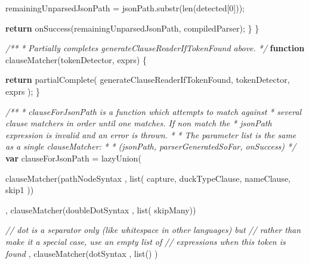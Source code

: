\documentclass[]{article}
\newenvironment{Shaded}{}{}
\newcommand{\KeywordTok}[1]{\textcolor[rgb]{0.00,0.44,0.13}{\textbf{{#1}}}}
\newcommand{\DecValTok}[1]{\textcolor[rgb]{0.25,0.63,0.44}{{#1}}}
\newcommand{\CommentTok}[1]{\textcolor[rgb]{0.38,0.63,0.69}{\textit{{#1}}}}
\newcommand{\OtherTok}[1]{\textcolor[rgb]{0.00,0.44,0.13}{{#1}}}
\newcommand{\FunctionTok}[1]{\textcolor[rgb]{0.02,0.16,0.49}{{#1}}}
\newcommand{\NormalTok}[1]{{#1}}
\begin{document}
\begin{Shaded}
\begin{Highlighting}[]
             \NormalTok{remainingUnparsedJsonPath = }\OtherTok{jsonPath}\NormalTok{.}\FunctionTok{substr}\NormalTok{(}\FunctionTok{len}\NormalTok{(detected[}\DecValTok{0}\NormalTok{]));                }
                               
         \KeywordTok{return} \FunctionTok{onSuccess}\NormalTok{(remainingUnparsedJsonPath, compiledParser);}
      \NormalTok{\}         }
   \NormalTok{\}}
                 
   \CommentTok{/**}
\CommentTok{    * Partially completes generateClauseReaderIfTokenFound above. }
\CommentTok{    */}
   \KeywordTok{function} \FunctionTok{clauseMatcher}\NormalTok{(tokenDetector, exprs) \{}
        
      \KeywordTok{return}   \FunctionTok{partialComplete}\NormalTok{( }
                  \NormalTok{generateClauseReaderIfTokenFound, }
                  \NormalTok{tokenDetector, }
                  \NormalTok{exprs }
               \NormalTok{);}
   \NormalTok{\}}

   \CommentTok{/**}
\CommentTok{    * clauseForJsonPath is a function which attempts to match against }
\CommentTok{    * several clause matchers in order until one matches. If non match the}
\CommentTok{    * jsonPath expression is invalid and an error is thrown.}
\CommentTok{    * }
\CommentTok{    * The parameter list is the same as a single clauseMatcher:}
\CommentTok{    * }
\CommentTok{    *    (jsonPath, parserGeneratedSoFar, onSuccess)}
\CommentTok{    */}     
   \KeywordTok{var} \NormalTok{clauseForJsonPath = }\FunctionTok{lazyUnion}\NormalTok{(}

      \FunctionTok{clauseMatcher}\NormalTok{(pathNodeSyntax   , }\FunctionTok{list}\NormalTok{( capture, }
                                             \NormalTok{duckTypeClause, }
                                             \NormalTok{nameClause, }
                                             \NormalTok{skip1 ))}
                                                     
   \NormalTok{,  }\FunctionTok{clauseMatcher}\NormalTok{(doubleDotSyntax  , }\FunctionTok{list}\NormalTok{( skipMany))}
       
       \CommentTok{// dot is a separator only (like whitespace in other languages) but }
       \CommentTok{// rather than make it a special case, use an empty list of }
       \CommentTok{// expressions when this token is found}
   \NormalTok{,  }\FunctionTok{clauseMatcher}\NormalTok{(dotSyntax        , }\FunctionTok{list}\NormalTok{() )  }
                                                                                      

\end{Highlighting}
\end{Shaded}
\end{document}
